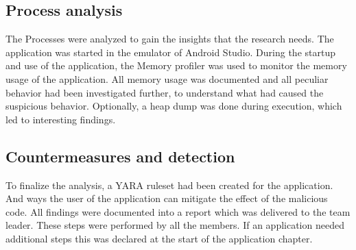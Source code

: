\subsection{Process analysis}
The Processes were analyzed to gain the insights that the research needs.
The application was started in the emulator of Android Studio.
During the startup and use of the application, the Memory profiler was used to monitor the memory usage of the application.
All memory usage was documented and all peculiar behavior had been investigated further, to understand what had caused the suspicious behavior.
Optionally, a heap dump was done during execution, which led to interesting findings.

\subsection{Countermeasures and detection}

To finalize the analysis, a YARA ruleset had been created for the application.
And ways the user of the application can mitigate the effect of the malicious code. 
All findings were documented into a report which was delivered to the team leader.
These steps were performed by all the members.
If an application needed additional steps this was declared at the start of the application chapter.